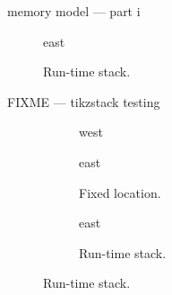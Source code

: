 \documentclass[10pt,t,svgnames]{beamer}
\begin{document}
\begin{frame}{memory model --- part i}
{\begin{itemize}
        \begin{figure}
          \begin{tikzstack}[fg]
            \begin{stack}{east}
            \end{stack}
          \end{tikzstack}
          \caption{Run-time stack.}
        \end{figure}
      \end{itemize}
    }
  \end{frame}

  \begin{frame}{FIXME --- tikzstack testing}
    \begin{figure}
      \centering
      \begin{subfigure}[b]{.50\textwidth}
        \centering
        \begin{tikzstack}[bg]
          \begin{stack}{west}
          \end{stack}
          \begin{stack}[xshift=7em]{east}
          \end{stack}
        \end{tikzstack}
        \caption{Fixed location.}
      \end{subfigure}
      \quad
      \begin{subfigure}[b]{.30\textwidth}
        \centering
        \begin{tikzstack}[fg]
          \begin{stack}{east}
          \end{stack}
        \end{tikzstack}
        \caption{Run-time stack.}
      \end{subfigure}
    \end{figure}
  \end{frame}
\end{document}
